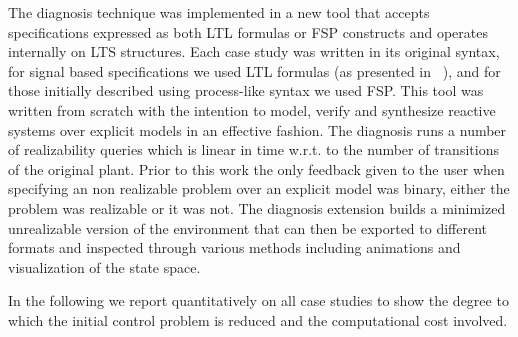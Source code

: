 \vspace{-1em}
The diagnosis technique was implemented in a new tool that accepts specifications expressed as both LTL formulas or FSP constructs and operates internally on LTS structures. Each case study was written in its original syntax, for signal based specifications we used LTL formulas (as presented in ~\cite{Bloem:2012}), and for those initially described using process-like syntax we used FSP. This tool was written from scratch with the intention to model, verify and synthesize reactive systems over explicit models in an effective fashion. 
The diagnosis runs a number of realizability queries which is linear in time w.r.t. to the number of transitions of the original plant.
Prior to this work the only feedback given to the user  when specifying an non realizable problem over an explicit model was binary, either the problem was realizable or it was not.
The diagnosis extension builds a minimized unrealizable version of the environment that can then be exported to different formats and inspected through various methods including animations and visualization of the state space.

In the following we report quantitatively on all case studies to show the degree to which the initial control problem is reduced and the computational cost involved. 

